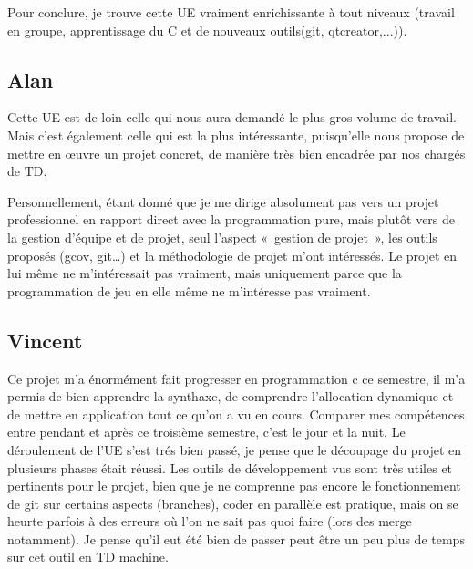 \documentclass[12]{article}
\begin{document}
Pour conclure, je trouve cette UE vraiment enrichissante à tout niveaux (travail en groupe, apprentissage du C et de nouveaux outils(git, qtcreator,...)).

\subsection{Alan}
Cette UE est de loin celle qui nous aura demandé le plus gros volume de travail. Mais c’est également celle qui est la plus intéressante, puisqu’elle nous propose de mettre en œuvre un projet concret, de manière très bien encadrée par nos chargés de TD.

Personnellement, étant donné que je me dirige absolument pas vers un projet professionnel en rapport direct avec la programmation pure, mais plutôt vers de la gestion d’équipe et de projet, seul l’aspect « gestion de projet », les outils proposés (gcov, git…) et la méthodologie de projet m’ont intéressés. Le projet en lui même ne m’intéressait pas vraiment, mais uniquement parce que la programmation de jeu en elle même ne m’intéresse pas vraiment.

\subsection{Vincent}
Ce projet m'a énormément fait progresser en programmation c ce semestre, il m'a permis de bien apprendre la synthaxe, de comprendre l'allocation dynamique et de mettre en application tout ce qu'on a vu en cours. Comparer mes compétences entre pendant et après ce troisième semestre, c'est le jour et la nuit. Le déroulement de l'UE s'est trés bien passé, je pense que le découpage du projet en plusieurs phases était réussi. Les outils de développement vus sont très utiles et pertinents pour le projet, bien que je ne comprenne pas encore le fonctionnement de git sur certains aspects (branches), coder en parallèle est pratique, mais on se heurte parfois à des erreurs où l'on ne sait pas quoi faire (lors des merge notamment). Je pense qu'il eut été bien de passer peut être un peu plus de temps sur cet outil en TD machine.
\end{document}
